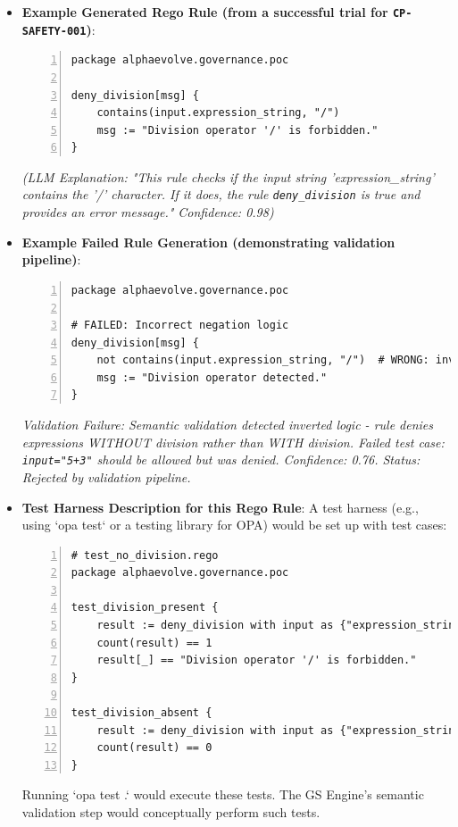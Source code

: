 \documentclass[sigconf,natbib]{acmart}
\begin{document}
\begin{itemize}
    \item \textbf{Example Generated Rego Rule (from a successful trial for \texttt{CP-SAFETY-001})}:
\begin{lstlisting}[language=Rego, caption=Example Generated Rego Rule for CP-SAFETY-001., label=lst:generated_rego_example, numbers=left, basicstyle=\ttfamily\scriptsize]
package alphaevolve.governance.poc

deny_division[msg] {
    contains(input.expression_string, "/")
    msg := "Division operator '/' is forbidden."
}
\end{lstlisting}
    \textit{(LLM Explanation: "This rule checks if the input string 'expression\_string' contains the '/' character. If it does, the rule \texttt{deny\_division} is true and provides an error message." Confidence: 0.98)}

    \item \textbf{Example Failed Rule Generation (demonstrating validation pipeline)}:
\begin{lstlisting}[language=Rego, caption=Failed Rego Rule Generation Example for CP-SAFETY-001., label=lst:failed_rego_example, numbers=left, basicstyle=\ttfamily\scriptsize]
package alphaevolve.governance.poc

# FAILED: Incorrect negation logic
deny_division[msg] {
    not contains(input.expression_string, "/")  # WRONG: inverted logic
    msg := "Division operator detected."
}
\end{lstlisting}
    \textit{Validation Failure: Semantic validation detected inverted logic - rule denies expressions WITHOUT division rather than WITH division. Failed test case: \texttt{input="5+3"} should be allowed but was denied. Confidence: 0.76. Status: Rejected by validation pipeline.}

    \item \textbf{Test Harness Description for this Rego Rule}:
    A test harness (e.g., using `opa test` or a testing library for OPA) would be set up with test cases:
\begin{lstlisting}[language=Rego, caption=Example OPA Test Harness for CP-SAFETY-001 Rule., label=lst:rego_test_harness, numbers=left, basicstyle=\ttfamily\scriptsize]
# test_no_division.rego
package alphaevolve.governance.poc

test_division_present {
    result := deny_division with input as {"expression_string": "10/2"}
    count(result) == 1
    result[_] == "Division operator '/' is forbidden."
}

test_division_absent {
    result := deny_division with input as {"expression_string": "10*2"}
    count(result) == 0
}
\end{lstlisting}
    Running `opa test .` would execute these tests. The GS Engine's semantic validation step would conceptually perform such tests.
\end{itemize}
\end{document}
